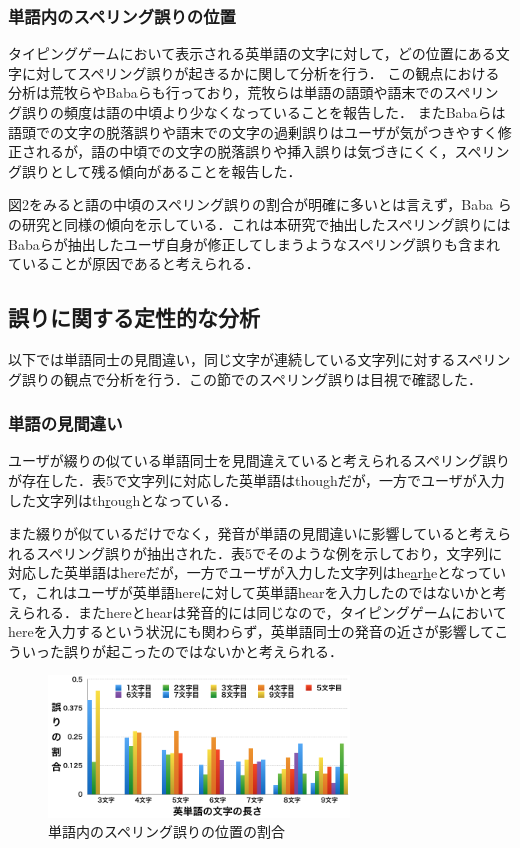 \documentclass{jarticle}
\begin{document}
\subsubsection{単語内のスペリング誤りの位置}
タイピングゲームにおいて表示される英単語の文字に対して，どの位置にある文字に対してスペリング誤りが起きるかに関して分析を行う．
この観点における分析は荒牧ら\cite{aramakiNLP2010}やBabaら\cite{babaACL2012}も行っており，荒牧らは単語の語頭や語末でのスペリング誤りの頻度は語の中頃より少なくなっていることを報告した．
またBabaらは語頭での文字の脱落誤りや語末での文字の過剰誤りはユーザが気がつきやすく修正されるが，語の中頃での文字の脱落誤りや挿入誤りは気づきにくく，スペリング誤りとして残る傾向があることを報告した．

図2をみると語の中頃のスペリング誤りの割合が明確に多いとは言えず，Baba らの研究と同様の傾向を示している．これは本研究で抽出したスペリング誤りにはBabaらが抽出したユーザ自身が修正してしまうようなスペリング誤り\cite{babaACL2012}も含まれていることが原因であると考えられる．

\subsection{誤りに関する定性的な分析}
以下では単語同士の見間違い，同じ文字が連続している文字列に対するスペリング誤りの観点で分析を行う．この節でのスペリング誤りは目視で確認した．

\subsubsection{単語の見間違い}
ユーザが綴りの似ている単語同士を見間違えていると考えられるスペリング誤りが存在した．表5で文字列に対応した英単語はthoughだが，一方でユーザが入力した文字列はth\underline{r}oughとなっている．

また綴りが似ているだけでなく，発音が単語の見間違いに影響していると考えられるスペリング誤りが抽出された．表5でそのような例を示しており，文字列に対応した英単語はhereだが，一方でユーザが入力した文字列はhe\underline{a}r\underline{h}eとなっていて，これはユーザが英単語hereに対して英単語hearを入力したのではないかと考えられる．またhereとhearは発音的には同じなので，タイピングゲームにおいてhereを入力するという状況にも関わらず，英単語同士の発音の近さが影響してこういった誤りが起こったのではないかと考えられる．

\begin{figure}[t]
	\centering
		\includegraphics[width=8cm]{graph.png}
		\caption{単語内のスペリング誤りの位置の割合}
		\label{LabelExa}
\end{figure}
\end{document}
